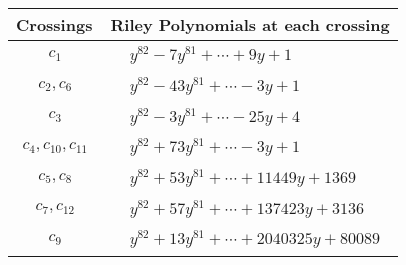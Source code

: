 \documentclass[1p]{elsarticle_modified}
\theoremstyle{definition}
\begin{document}
\begin{tabular}{m{50pt}|m{274pt}}
Crossings & \hspace{64pt}Riley Polynomials at each crossing \\
\hline $$\begin{aligned}c_{1}\end{aligned}$$&$\begin{aligned}
&y^{82}-7 y^{81}+\cdots+9 y+1
\end{aligned}$\\
\hline $$\begin{aligned}c_{2},c_{6}\end{aligned}$$&$\begin{aligned}
&y^{82}-43 y^{81}+\cdots-3 y+1
\end{aligned}$\\
\hline $$\begin{aligned}c_{3}\end{aligned}$$&$\begin{aligned}
&y^{82}-3 y^{81}+\cdots-25 y+4
\end{aligned}$\\
\hline $$\begin{aligned}c_{4},c_{10},c_{11}\end{aligned}$$&$\begin{aligned}
&y^{82}+73 y^{81}+\cdots-3 y+1
\end{aligned}$\\
\hline $$\begin{aligned}c_{5},c_{8}\end{aligned}$$&$\begin{aligned}
&y^{82}+53 y^{81}+\cdots+11449 y+1369
\end{aligned}$\\
\hline $$\begin{aligned}c_{7},c_{12}\end{aligned}$$&$\begin{aligned}
&y^{82}+57 y^{81}+\cdots+137423 y+3136
\end{aligned}$\\
\hline $$\begin{aligned}c_{9}\end{aligned}$$&$\begin{aligned}
&y^{82}+13 y^{81}+\cdots+2040325 y+80089
\end{aligned}$\\
\hline
\end{tabular}
\vskip 2pc
\end{document}
